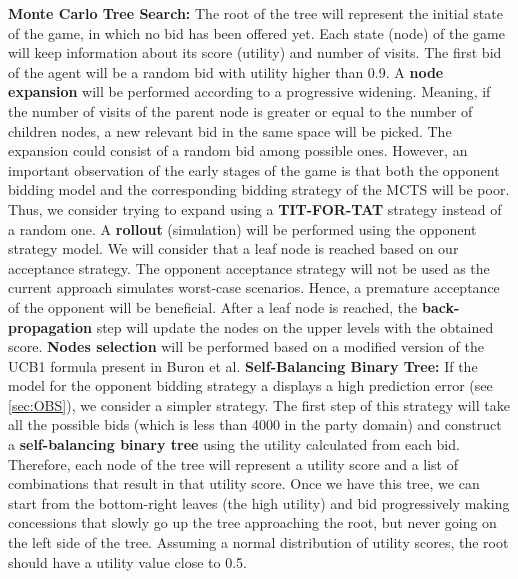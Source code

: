 \documentclass[a4paper,11pt]{article}
\theoremstyle{mytheor}
\begin{document}
\textbf{Monte Carlo Tree Search:} The root of the tree will represent the initial state of the game, in which no bid has been offered yet. Each state (node) of the game will keep information about its score (utility) and number of visits. The first bid of the agent will be a random bid with utility higher than 0.9. A \textbf{node expansion} will be performed according to a progressive widening. Meaning, if the number of visits of the parent node is greater or equal to the number of children nodes, a new relevant bid in the same space will be picked. The expansion could consist of a random bid among possible ones. However, an important observation of the early stages of the game is that both the opponent bidding model and the corresponding bidding strategy of the MCTS will be poor. Thus, we consider trying to expand using a \textbf{TIT-FOR-TAT} strategy instead of a random one. A \textbf{rollout} (simulation) will be performed using the opponent strategy model. We will consider that a leaf node is reached based on our acceptance strategy. The opponent acceptance strategy will not be used as the current approach simulates worst-case scenarios. Hence, a premature acceptance of the opponent will be beneficial. After a leaf node is reached, the \textbf{back-propagation} step will update the nodes on the upper levels with the obtained score. \textbf{Nodes selection} will be performed based on a modified version of the UCB1 formula present in Buron et al. 
\textbf{Self-Balancing Binary Tree:} If the model for the opponent bidding strategy a displays a high prediction error (see \autoref{sec:OBS}), we consider a simpler strategy. The first step of this strategy will take all the possible bids (which is less than 4000 in the party domain) and construct a \textbf{self-balancing binary tree} using the utility calculated from each bid. Therefore, each node of the tree will represent a utility score and a list of combinations that result in that utility score. Once we have this tree, we can start from the bottom-right leaves (the high utility) and bid progressively making concessions that slowly go up the tree approaching the root, but never going on the left side of the tree. Assuming a normal distribution of utility scores, the root should have a utility value close to 0.5.
\end{document}
